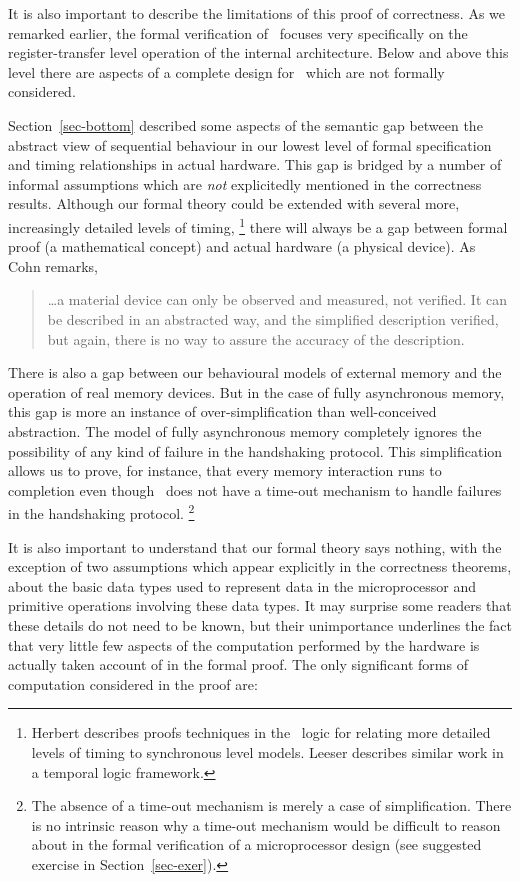 It is also important to describe the limitations of this
proof of correctness.
As we remarked earlier,
the formal verification of \Tamarack\ focuses very specifically
on the register-transfer level operation of the internal architecture.
Below and above this level
there are aspects of a complete design
for \Tamarack\ which are not formally considered.

Section~\ref{sec-bottom}
described some aspects of the semantic gap between
the abstract view of sequential behaviour in our
lowest level of formal specification and
timing relationships in actual hardware.
This gap is bridged by a number of informal assumptions
which are {\it not} explicitedly mentioned in the correctness results.
Although our formal theory could be extended with
several more, increasingly detailed levels of timing,
\footnote{
Herbert \cite{Herbert:thesis}
describes proofs techniques in the \HOL\ logic
for relating more detailed levels of timing to
synchronous level models.
Leeser \cite{Leeser:thesis} describes similar work
in a temporal logic framework.}
there will always be a gap between formal proof (a mathematical concept)
and actual hardware (a physical device).
As Cohn \cite{Cohn:banff87} remarks,

\begin{quotation}
\ldots a material device can only be observed and measured, not verified.
It can be described in an abstracted way, and the simplified description
verified, but again, there is no way to assure the accuracy of the
description.
\end{quotation}

There is also a gap between our behavioural models of external
memory and the operation of real memory devices.
But in the case of fully asynchronous memory,
this gap is more an instance of
over-simplification than well-conceived abstraction.
The model of fully asynchronous memory completely ignores the possibility
of any kind of failure in the handshaking protocol.
This simplification allows us to prove, for instance, that every
memory interaction runs to completion even though \Tamarack\
does not have a time-out mechanism to handle failures
in the handshaking protocol.
\footnote{
The absence of a time-out mechanism is merely a case of simplification.
There is no intrinsic reason why a time-out mechanism would be
difficult to reason about in the formal verification of a microprocessor
design (see suggested exercise in Section~\ref{sec-exer}).}

It is also important to understand that our formal theory
says nothing,
with the exception of
two assumptions which appear
explicitly in the correctness theorems,
about the basic data types used to represent
data in the microprocessor and primitive operations
involving these data types.
It may surprise some readers that these details do not need to be known,
but their unimportance underlines
the fact that very little few aspects of the computation
performed by the hardware is actually taken account of in the formal
proof.
The only significant forms of computation considered in the proof are:

